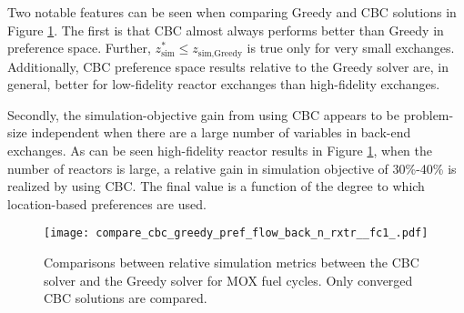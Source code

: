 Two notable features can be seen when comparing Greedy and CBC solutions in
Figure \ref{fig:compare_cbc_greedy_pref_flow_back_n_rxtr__fc1_}. The first is
that CBC almost always performs better than Greedy in preference space. Further,
$z^*_{\text{sim}} \leq z_{\text{sim}, \text{Greedy}}$ is true only for very
small exchanges. Additionally, CBC preference space results relative to the
Greedy solver are, in general, better for low-fidelity reactor exchanges than
high-fidelity exchanges.

Secondly, the simulation-objective gain from using CBC appears to be
problem-size independent when there are a large number of variables in back-end
exchanges. As can be seen high-fidelity reactor results in Figure
\ref{fig:compare_cbc_greedy_pref_flow_back_n_rxtr__fc1_}, when the number of
reactors is large, a relative gain in simulation objective of 30\%-40\% is
realized by using CBC. The final value is a function of the degree to which
location-based preferences are used.

\begin{figure}[h!]
  \begin{center}
    \texttt{[image: compare\_cbc\_greedy\_pref\_flow\_back\_n\_rxtr\_\_fc1\_.pdf]}
    \caption{
      \label{fig:compare_cbc_greedy_pref_flow_back_n_rxtr__fc1_}
      Comparisons between relative simulation metrics between the CBC solver and
      the Greedy solver for MOX fuel cycles. Only converged CBC
      solutions are compared.  }
  \end{center}
\end{figure}
